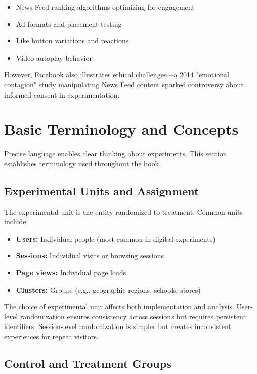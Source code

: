 \begin{itemize}
    \item News Feed ranking algorithms optimizing for engagement
    \item Ad formats and placement testing
    \item Like button variations and reactions
    \item Video autoplay behavior
\end{itemize}

However, Facebook also illustrates ethical challenges—a 2014 "emotional contagion" study manipulating News Feed content sparked controversy about informed consent in experimentation.

\section{Basic Terminology and Concepts}

Precise language enables clear thinking about experiments. This section establishes terminology used throughout the book.

\subsection{Experimental Units and Assignment}

\begin{definition}
The experimental unit is the entity randomized to treatment. Common units include:
\begin{itemize}
    \item \textbf{Users:} Individual people (most common in digital experiments)
    \item \textbf{Sessions:} Individual visits or browsing sessions
    \item \textbf{Page views:} Individual page loads
    \item \textbf{Clusters:} Groups (e.g., geographic regions, schools, stores)
\end{itemize}
\end{definition}

The choice of experimental unit affects both implementation and analysis. User-level randomization ensures consistency across sessions but requires persistent identifiers. Session-level randomization is simpler but creates inconsistent experiences for repeat visitors.

\subsection{Control and Treatment Groups}

